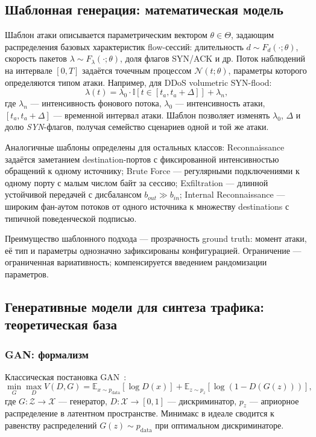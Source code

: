 \subsection{Шаблонная генерация: математическая модель}

Шаблон атаки описывается параметрическим вектором
\(\theta \in \Theta\), задающим распределения базовых характеристик
flow-сессий: длительность \(d \sim F_d(\cdot;\theta)\), скорость пакетов
\(\lambda \sim F_\lambda(\cdot;\theta)\), доля флагов SYN/ACK и др. Поток
наблюдений на интервале \([0, T]\) задаётся точечным процессом
\(\mathcal{N}(t;\theta)\), параметры которого определяются типом атаки.
Например, для DDoS volumetric SYN-flood:
\begin{equation}
\lambda(t) = \lambda_0 \cdot \mathbb{I}[t \in [t_a, t_a + \Delta]] + \lambda_n,
\label{eq:ddos-rate}
\end{equation}
где \(\lambda_n\) --- интенсивность фонового потока, \(\lambda_0\) ---
интенсивность атаки, \([t_a, t_a + \Delta]\) --- временной интервал атаки.
Шаблон позволяет изменять \(\lambda_0\), \(\Delta\) и долю \emph{SYN}-флагов,
получая семейство сценариев одной и той же атаки.

Аналогичные шаблоны определены для остальных классов: Reconnaissance задаётся
заметанием destination-портов с фиксированной интенсивностью обращений к
одному источнику; Brute Force --- регулярными подключениями к одному порту с
малым числом байт за сессию; Exfiltration --- длинной устойчивой передачей с
дисбалансом \(b_{out} \gg b_{in}\); Internal Reconnaissance --- широким
фан-аутом потоков от одного источника к множеству destinations с типичной
поведенческой подписью.

Преимущество шаблонного подхода --- прозрачность ground truth: момент атаки,
её тип и параметры однозначно зафиксированы конфигурацией. Ограничение ---
ограниченная вариативность; компенсируется введением рандомизации параметров.

\subsection{Генеративные модели для синтеза трафика: теоретическая база}

\subsubsection{GAN: формализм}

Классическая постановка GAN~\cite{goodfellow2014gan}:
\begin{equation}
\min_{G}\max_{D}
V(D,G) = \mathbb{E}_{x \sim p_{\text{data}}}[\log D(x)] +
         \mathbb{E}_{z \sim p_z}[\log(1 - D(G(z)))],
\label{eq:gan}
\end{equation}
где \(G\colon \mathcal{Z} \to \mathcal{X}\) --- генератор,
\(D\colon \mathcal{X} \to [0,1]\) --- дискриминатор,
\(p_z\) --- априорное распределение в латентном пространстве.
Минимакс  в идеале сводится к равенству распределений
\(G(z) \sim p_{\text{data}}\) при оптимальном дискриминаторе.

